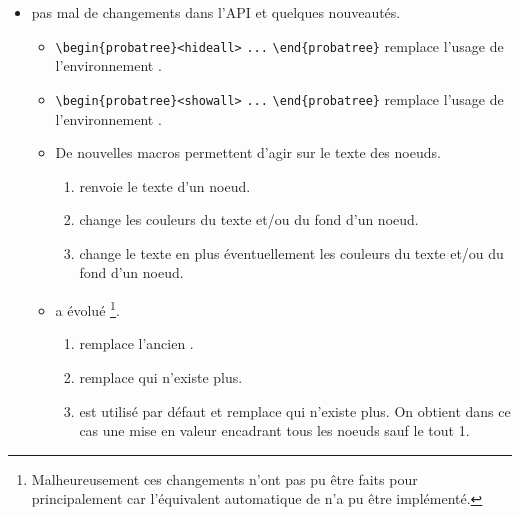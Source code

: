 \documentclass[12pt,a4paper]{book}
\begin{document}
\begin{description}
\begin{itemize}[itemsep=.5em]


    \item {}
    	  pas mal de changements dans l'API et quelques nouveautés.

    \begin{itemize}[itemsep=.5em]
        \item \verb#\begin{probatree}<hideall># \verb#...# \verb#\end{probatree}#  remplace l'usage de l'environnement .


        \item \verb#\begin{probatree}<showall># \verb#...# \verb#\end{probatree}# remplace l'usage de l'environnement .


        \item De nouvelles macros permettent d'agir sur le texte des noeuds.

        \begin{enumerate}
        	\item {} renvoie le texte d'un noeud.

        	\item {} change les couleurs du texte et/ou du fond d'un noeud.

        	\item {} change le texte en plus éventuellement  les couleurs du texte et/ou du fond d'un noeud.
        \end{enumerate}


        \item {} a évolué
              \footnote{
              		Malheureusement ces changements n'ont pas pu être faits pour  principalement car l'équivalent automatique de  n'a pu être implémenté.
			  }.

        \begin{enumerate}
        	\item {} remplace l'ancien .

        	\item {} remplace  qui n'existe plus.

        	\item {} est utilisé par défaut et remplace  qui n'existe plus. On obtient dans ce cas une mise en valeur encadrant tous les noeuds sauf le tout 1\ier{}.


\end{enumerate}
\end{itemize}
\end{itemize}
\end{description}
\end{document}
